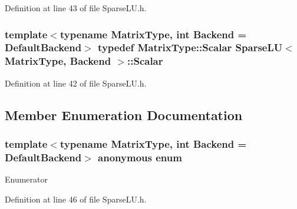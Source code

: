 Definition at line 43 of file Sparse\-L\-U.\-h.

\hypertarget{class_sparse_l_u_a1c13b088bd115436caa27f0f8f0c26fd}{
\subsubsection[{Scalar}]{\setlength{\rightskip}{0pt plus 5cm}template$<$typename Matrix\-Type, int Backend = Default\-Backend$>$ typedef Matrix\-Type\-::\-Scalar {\bf Sparse\-L\-U}$<$ Matrix\-Type, Backend $>$\-::{\bf Scalar}\hspace{0.3cm}{\ttfamily [protected]}}}\label{class_sparse_l_u_a1c13b088bd115436caa27f0f8f0c26fd}


Definition at line 42 of file Sparse\-L\-U.\-h.



\subsection{Member Enumeration Documentation}
\hypertarget{class_sparse_l_u_ae24c4bbe9625458772050a8cefa747e6}{\subsubsection[{anonymous enum}]{\setlength{\rightskip}{0pt plus 5cm}template$<$typename Matrix\-Type, int Backend = Default\-Backend$>$ anonymous enum\hspace{0.3cm}{\ttfamily [protected]}}}\label{class_sparse_l_u_ae24c4bbe9625458772050a8cefa747e6}
\begin{Desc}
\item[Enumerator]\par
\begin{description}
\item[{\em 
\hypertarget{class_sparse_l_u_ae24c4bbe9625458772050a8cefa747e6a7db92998d2341577c9230aa6f1b2e3fd}{Matrix\-L\-U\-Is\-Dirty}\label{class_sparse_l_u_ae24c4bbe9625458772050a8cefa747e6a7db92998d2341577c9230aa6f1b2e3fd}
}]\end{description}
\end{Desc}


Definition at line 46 of file Sparse\-L\-U.\-h.



